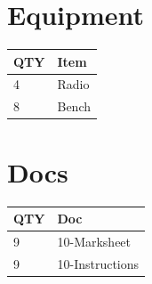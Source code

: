 \documentclass[10pt, A5]{article}
\begin{document}
\begin{framed}
\begin{minipage}{\textwidth}
\begin{multicols}{2}
		\section*{\faWrench \: Equipment}

		
	\begin{center}
			\begin{tabular}{p{2cm}p{4cm}}


				\textbf{QTY} & \textbf{Item} \\\toprule
												4&Radio\\\midrule
												8&Bench\\\midrule
								\end{tabular}

			\end{center}

		
		\vfill\null
		\columnbreak

			\section*{\faFile \: Docs}
		 	\begin{center}
			\begin{tabular}{p{2cm}p{4cm}}

			\textbf{QTY} & \textbf{Doc} \\\toprule
										9&10-Marksheet\\\midrule
										9&10-Instructions\\\midrule
							\end{tabular}
			\end{center}
	

		\vfill\null

		\end{multicols}
\end{minipage}
\end{framed}
\end{document}

